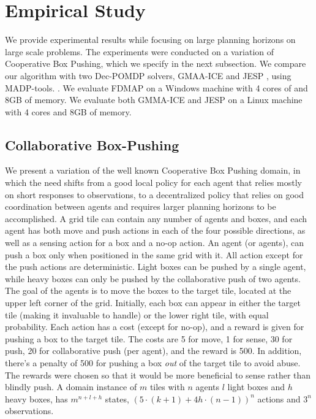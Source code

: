 \documentclass[letterpaper]{article} %
\newcommand{\cbp}[0]{Collaborative Box-Pushing}
\begin{document}
\section{Empirical Study}
We provide experimental results while focusing on large planning horizons on large scale problems.
The experiments were conducted on a variation of Cooperative Box Pushing, which we specify in the next subsection.
We compare our algorithm with two Dec-POMDP solvers, GMAA-ICE \cite{} and JESP \cite{}, using MADP-tools. \cite{}.
We evaluate FDMAP on a Windows machine with 4 cores of and 8GB of memory.
We evaluate both GMMA-ICE and JESP on a Linux machine with 4 cores and 8GB of memory.


\subsection{\cbp}
We present a variation of the well known Cooperative Box Pushing domain, in which the need shifts from a good local policy for each agent that relies mostly on short responses to observations, to a decentralized policy that relies on good coordination between agents and requires larger planning horizons to be accomplished. A grid tile can contain any number of agents and boxes, and each agent has both move and push actions in each of the four possible directions, as well as a sensing action for a box and a no-op action.
An agent (or agents), can push a box only when positioned in the same grid with it.
All action except for the push actions are deterministic.
Light boxes can be pushed by a single agent, while heavy boxes can only be pushed by the collaborative push of two agents.
The goal of the agents is to move the boxes to the target tile, located at the upper left corner of the grid.
Initially, each box can appear in either the target tile (making it invaluable to handle) or the lower right tile, with equal probability.
Each action has a cost (except for no-op), and a reward is given for pushing a box to the target tile. The costs are 5 for move, 1 for sense, 30 for push, 20 for collaborative push (per agent), and the reward is 500. In addition, there's a penalty of 500 for pushing a box \emph{out} of the target tile to avoid abuse.
The rewards were chosen so that it would be more beneficial to sense rather than blindly push.
A domain instance of $m$ tiles with $n$ agents $l$ light boxes and $h$ heavy boxes, has $m^{n+l+h}$ states, $(5\cdot(k+1)+4h\cdot(n-1))^n$ actions and $3^n$ observations. 
\end{document}
